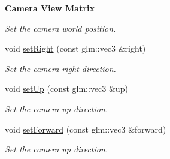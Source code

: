 \begin{Indent}{\bf Camera View Matrix}
\begin{DoxyCompactItemize}
\begin{DoxyCompactList}\small\item\em Set the camera world position. \end{DoxyCompactList}\item 
void \hyperlink{classCamera_a02cf8fe9d3413fcb1f95a14ef02da9a3}{set\+Right} (const glm\+::vec3 \&right)
\begin{DoxyCompactList}\small\item\em Set the camera right direction. \end{DoxyCompactList}\item 
void \hyperlink{classCamera_acd252404a7ef31e327af15710bd433a4}{set\+Up} (const glm\+::vec3 \&up)
\begin{DoxyCompactList}\small\item\em Set the camera up direction. \end{DoxyCompactList}\item 
void \hyperlink{classCamera_acb3d907db2b33b09c4861e215e2e21eb}{set\+Forward} (const glm\+::vec3 \&forward)
\begin{DoxyCompactList}\small\item\em Set the camera up direction. \end{DoxyCompactList}\end{DoxyCompactItemize}
\end{Indent}
